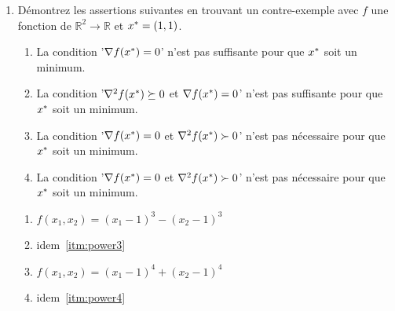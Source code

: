 \begin{enumerate}
  \item Démontrez les assertions suivantes en trouvant un contre-exemple
  avec $f$ une fonction de $\mathbb{R}^2 \rightarrow \mathbb{R}$
  et $x^* = (1,1)$.
  \begin{enumerate}
    \item La condition '$\nabla f(x^*)=0$' 
    n'est pas suffisante pour que $x^*$ soit un minimum.
    \item La condition '$\nabla^2 f(x^*)\succeq 0$ et $\nabla f(x^*)=0$'
    n'est pas suffisante pour que $x^*$ soit un minimum.
    \item La condition '$\nabla f(x^*) = 0$ et $\nabla^2 f(x^*)\succ 0$' 
    n'est pas nécessaire pour que $x^*$ soit un minimum.  
    \item La condition '$\nabla f(x^*)=0$ et $\nabla^2 f(x^*) \succ 0$' 
    n'est pas nécessaire pour que $x^*$ soit un minimum.
  \end{enumerate}
  
    \begin{solution}
      \begin{enumerate}
        \item $f(x_1,x_2) = (x_1 - 1)^3 - (x_2 - 1)^3$ \label{itm:power3}
        \item idem~\ref{itm:power3}
        \item $f(x_1,x_2) = (x_1 - 1)^4 + (x_2 - 1)^4$ \label{itm:power4}
        \item idem~\ref{itm:power4}
      \end{enumerate}
    \end{solution}
    
\end{enumerate}
